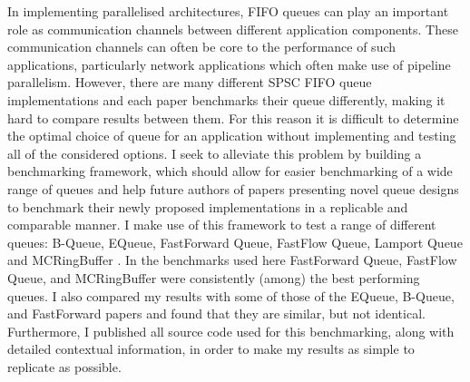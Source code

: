 \null\vfil
\begin{center}\textsf{\textbf{\abstractname}}\end{center}

\noindent In implementing parallelised architectures, FIFO queues can play an important role as communication channels
between different application components\cite{WangCheng2009}.
These communication channels can often be core to the performance of such applications, particularly network
applications which often make use of pipeline parallelism\cite{Upadhyaya2007,WangCheng2009}.
However, there are many different SPSC FIFO queue implementations and each paper benchmarks their queue
differently, making it hard to compare results between them.
For this reason it is difficult to determine the optimal choice of queue for an application without implementing and
testing all of the considered options.
I seek to alleviate this problem by building a benchmarking framework, which should allow for easier
benchmarking of a wide range of queues and help future authors of papers presenting novel queue designs to
benchmark their newly proposed implementations in a replicable and comparable manner.
I make use of this framework to test a range of different queues: B-Queue, EQueue, FastForward Queue,
FastFlow Queue, Lamport Queue and MCRingBuffer \cite{B-Queue,EQueue,FastForward,FastFlowGithub,Lamport,MCRingBuffer}.
In the benchmarks used here FastForward Queue, FastFlow Queue, and MCRingBuffer were consistently (among) the
best performing queues.
I also compared my results with some of those of the EQueue, B-Queue, and FastForward papers and found that
they are similar, but not identical.
Furthermore, I published all source code used for this benchmarking, along with detailed contextual information,
in order to make my results as simple to replicate as possible.

\vfil\null
